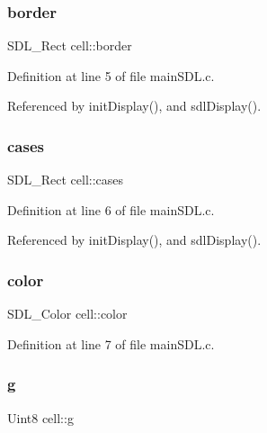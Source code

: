 \mbox{\label{structcell_ae289d5dfc43a03b47de6dffa417776df}} 
\subsubsection{\texorpdfstring{border}{border}}
{\footnotesize\ttfamily S\+D\+L\+\_\+\+Rect cell\+::border}



Definition at line 5 of file main\+S\+D\+L.\+c.



Referenced by init\+Display(), and sdl\+Display().

\mbox{\label{structcell_af2fb9745b37f309905e02fed903748a5}} 
\subsubsection{\texorpdfstring{cases}{cases}}
{\footnotesize\ttfamily S\+D\+L\+\_\+\+Rect cell\+::cases}



Definition at line 6 of file main\+S\+D\+L.\+c.



Referenced by init\+Display(), and sdl\+Display().

\mbox{\label{structcell_a17634ccb0012ada2dc1f042314d35c21}} 
\subsubsection{\texorpdfstring{color}{color}}
{\footnotesize\ttfamily S\+D\+L\+\_\+\+Color cell\+::color}



Definition at line 7 of file main\+S\+D\+L.\+c.

\mbox{\label{structcell_ac8a350a38ff279748cfe301a30c8878f}} 
\subsubsection{\texorpdfstring{g}{g}}
{\footnotesize\ttfamily Uint8 cell\+::g}



